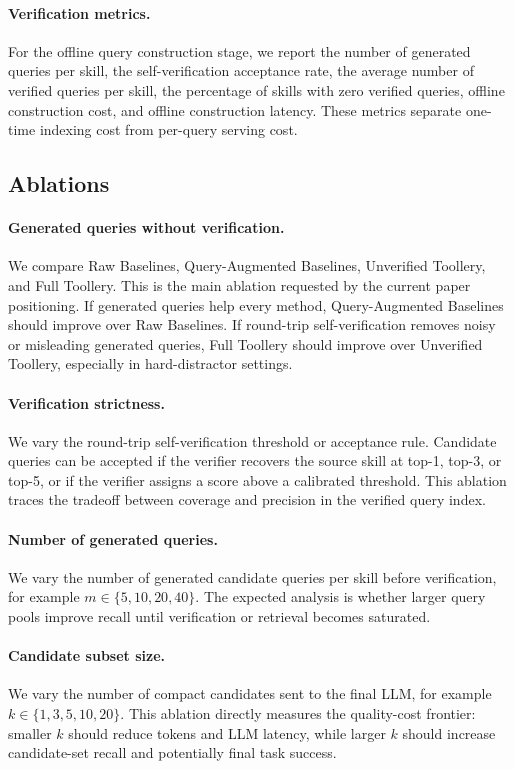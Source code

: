\paragraph{Verification metrics.}
For the offline query construction stage, we report the number of generated
queries per skill, the self-verification acceptance rate, the average number of
verified queries per skill, the percentage of skills with zero verified queries,
offline construction cost, and offline construction latency. These metrics
separate one-time indexing cost from per-query serving cost.

\subsection{Ablations}
\label{subsec:ablations}

\paragraph{Generated queries without verification.}
We compare Raw Baselines, Query-Augmented Baselines, Unverified Toollery, and
Full Toollery. This is the main ablation requested by the current paper
positioning. If generated queries help every method, Query-Augmented Baselines
should improve over Raw Baselines. If round-trip self-verification removes noisy
or misleading generated queries, Full Toollery should improve over Unverified
Toollery, especially in hard-distractor settings.

\paragraph{Verification strictness.}
We vary the round-trip self-verification threshold or acceptance rule. Candidate
queries can be accepted if the verifier recovers the source skill at top-1,
top-3, or top-5, or if the verifier assigns a score above a calibrated
threshold. This ablation traces the tradeoff between coverage and precision in
the verified query index.

\paragraph{Number of generated queries.}
We vary the number of generated candidate queries per skill before verification,
for example $m \in \{5, 10, 20, 40\}$. The expected analysis is whether larger
query pools improve recall until verification or retrieval becomes saturated.

\paragraph{Candidate subset size.}
We vary the number of compact candidates sent to the final LLM, for example
$k \in \{1, 3, 5, 10, 20\}$. This ablation directly measures the quality-cost
frontier: smaller $k$ should reduce tokens and LLM latency, while larger $k$
should increase candidate-set recall and potentially final task success.

